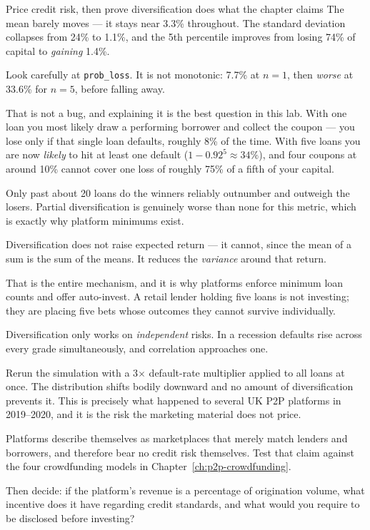 \begin{labproject}{Price credit risk, then prove diversification does what the chapter claims}
The mean barely moves --- it stays near 3.3\% throughout. The standard deviation collapses from 24\% to 1.1\%, and the 5th percentile improves from losing 74\% of capital to \emph{gaining} 1.4\%.

\begin{pitfall}
Look carefully at \texttt{prob\_loss}. It is not monotonic: 7.7\% at $n=1$, then \emph{worse} at 33.6\% for $n=5$, before falling away.

That is not a bug, and explaining it is the best question in this lab. With one loan you most likely draw a performing borrower and collect the coupon --- you lose only if that single loan defaults, roughly 8\% of the time. With five loans you are now \emph{likely} to hit at least one default ($1 - 0.92^5 \approx 34\%$), and four coupons at around 10\% cannot cover one loss of roughly 75\% of a fifth of your capital.

Only past about 20 loans do the winners reliably outnumber and outweigh the losers. Partial diversification is genuinely worse than none for this metric, which is exactly why platform minimums exist.
\end{pitfall}

\begin{keyidea}
Diversification does not raise expected return --- it cannot, since the mean of a sum is the sum of the means. It reduces the \emph{variance} around that return.

That is the entire mechanism, and it is why platforms enforce minimum loan counts and offer auto-invest. A retail lender holding five loans is not investing; they are placing five bets whose outcomes they cannot survive individually.
\end{keyidea}

\begin{pitfall}
Diversification only works on \emph{independent} risks. In a recession defaults rise across every grade simultaneously, and correlation approaches one.

Rerun the simulation with a 3$\times$ default-rate multiplier applied to all loans at once. The distribution shifts bodily downward and no amount of diversification prevents it. This is precisely what happened to several UK P2P platforms in 2019--2020, and it is the risk the marketing material does not price.
\end{pitfall}

\begin{tryit}
Platforms describe themselves as marketplaces that merely match lenders and borrowers, and therefore bear no credit risk themselves. Test that claim against the four crowdfunding models in Chapter~\ref{ch:p2p-crowdfunding}.

Then decide: if the platform's revenue is a percentage of origination volume, what incentive does it have regarding credit standards, and what would you require to be disclosed before investing?
\end{tryit}
\end{labproject}

